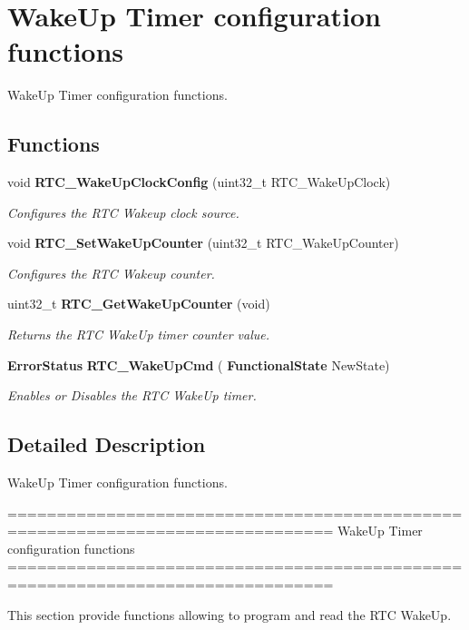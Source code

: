 \section{Wake\+Up Timer configuration functions}
\label{group__RTC__Group4}


Wake\+Up Timer configuration functions.  


\subsection*{Functions}
\begin{DoxyCompactItemize}
\item 
void \textbf{ R\+T\+C\+\_\+\+Wake\+Up\+Clock\+Config} (uint32\+\_\+t R\+T\+C\+\_\+\+Wake\+Up\+Clock)
\begin{DoxyCompactList}\small\item\em Configures the R\+TC Wakeup clock source. \end{DoxyCompactList}\item 
void \textbf{ R\+T\+C\+\_\+\+Set\+Wake\+Up\+Counter} (uint32\+\_\+t R\+T\+C\+\_\+\+Wake\+Up\+Counter)
\begin{DoxyCompactList}\small\item\em Configures the R\+TC Wakeup counter. \end{DoxyCompactList}\item 
uint32\+\_\+t \textbf{ R\+T\+C\+\_\+\+Get\+Wake\+Up\+Counter} (void)
\begin{DoxyCompactList}\small\item\em Returns the R\+TC Wake\+Up timer counter value. \end{DoxyCompactList}\item 
\textbf{ Error\+Status} \textbf{ R\+T\+C\+\_\+\+Wake\+Up\+Cmd} (\textbf{ Functional\+State} New\+State)
\begin{DoxyCompactList}\small\item\em Enables or Disables the R\+TC Wake\+Up timer. \end{DoxyCompactList}\end{DoxyCompactItemize}


\subsection{Detailed Description}
Wake\+Up Timer configuration functions. 

\begin{DoxyVerb} ===============================================================================
                     WakeUp Timer configuration functions
 ===============================================================================  

  This section provide functions allowing to program and read the RTC WakeUp.\end{DoxyVerb}
 

